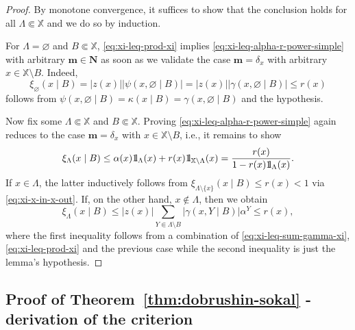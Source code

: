 \documentclass[10pt,a4paper]{amsart}
\newcommand{\X}{\mathbb X}
\def\1{{\mathchoice {1\mskip-4mu\mathrm l}      
{1\mskip-4mu\mathrm l}
{1\mskip-4.5mu\mathrm l} {1\mskip-5mu\mathrm l}}}
\begin{document}
\begin{proof}
	By monotone convergence, it suffices to show that the conclusion holds for all $\Lambda \Subset \X$ and we do so by induction.
	
	For $\Lambda = \varnothing$ and $B \Subset \X$, \eqref{eq:xi-leq-prod-xi} implies \eqref{eq:xi-leq-alpha-r-power-simple} with arbitrary $\mathbf m \in \mathbf N$ as soon as we validate the case $\mathbf m = \delta_x$ with arbitrary $x \in \X \setminus B$. 
	Indeed,
	\[
		\xi_\varnothing(x \mid B) = |z(x)| |\psi(x, \varnothing \mid B)| = |z(x)| |\gamma(x, \varnothing \mid B)| \leq r(x)
	\]
	follows from $\psi(x, \varnothing \mid B) = \kappa(x \mid B) = \gamma(x, \varnothing \mid B)$ and the hypothesis.
	
	Now fix some $\Lambda \Subset \X$ and $B \Subset \X$. 
	Proving \eqref{eq:xi-leq-alpha-r-power-simple} again reduces to the case $\mathbf m = \delta_x$ with $x \in \X \setminus B$, i.e., it remains to show
	\[
		\xi_\Lambda(x \mid B) \leq \alpha(x) \1_\Lambda(x) + r(x) \1_{\X \setminus \Lambda}(x) = \frac{r(x)}{1 - r(x) \1_\Lambda(x)}.
	\]
	If $x \in \Lambda$, the latter inductively follows from $\xi_{\Lambda \setminus \{x\}}(x \mid B) \leq r(x) < 1$ via \eqref{eq:xi-x-in-x-out}. 
	If, on the other hand, $x \notin \Lambda$, then we obtain
	\[
		\xi_\Lambda(x \mid B) \leq |z(x)| \sum_{Y \Subset \Lambda \setminus B} |\gamma(x, Y \mid B)| \alpha^Y \leq r(x),
	\]
	where the first inequality follows from a combination of \eqref{eq:xi-leq-sum-gamma-xi}, \eqref{eq:xi-leq-prod-xi} and the previous case while the second inequality is just the lemma's hypothesis.
\end{proof}

\subsection{Proof of Theorem~\ref{thm:dobrushin-sokal} - derivation of the criterion}
\end{document}
